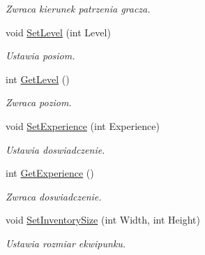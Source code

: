 \begin{DoxyCompactItemize}
\begin{DoxyCompactList}\small\item\em Zwraca kierunek patrzenia gracza. \end{DoxyCompactList}\item 
\mbox{\label{classtfp_1_1_player_a2e1f8245e3248349e75d065ccac3b747}} 
void \mbox{\hyperlink{classtfp_1_1_player_a2e1f8245e3248349e75d065ccac3b747}{Set\+Level}} (int Level)
\begin{DoxyCompactList}\small\item\em Ustawia posiom. \end{DoxyCompactList}\item 
\mbox{\label{classtfp_1_1_player_aadfd30b570e52a5482759a5f8a13dac1}} 
int \mbox{\hyperlink{classtfp_1_1_player_aadfd30b570e52a5482759a5f8a13dac1}{Get\+Level}} ()
\begin{DoxyCompactList}\small\item\em Zwraca poziom. \end{DoxyCompactList}\item 
\mbox{\label{classtfp_1_1_player_aec49ecba2508ef77b0a3f436024e1933}} 
void \mbox{\hyperlink{classtfp_1_1_player_aec49ecba2508ef77b0a3f436024e1933}{Set\+Experience}} (int Experience)
\begin{DoxyCompactList}\small\item\em Ustawia doswiadczenie. \end{DoxyCompactList}\item 
\mbox{\label{classtfp_1_1_player_ad42d94d800dfd5e4443e46e65eae3b8f}} 
int \mbox{\hyperlink{classtfp_1_1_player_ad42d94d800dfd5e4443e46e65eae3b8f}{Get\+Experience}} ()
\begin{DoxyCompactList}\small\item\em Zwraca doswiadczenie. \end{DoxyCompactList}\item 
\mbox{\label{classtfp_1_1_player_acabdb43e354fc56e0ae31237a27cb391}} 
void \mbox{\hyperlink{classtfp_1_1_player_acabdb43e354fc56e0ae31237a27cb391}{Set\+Inventory\+Size}} (int Width, int Height)
\begin{DoxyCompactList}\small\item\em Ustawia rozmiar ekwipunku. \end{DoxyCompactList}\item 

\end{DoxyCompactItemize}
